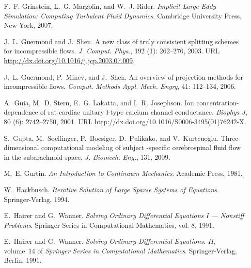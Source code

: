 \begin{thebibliography}{467}
F.~F. Grinstein, L.~G. Margolin, and W.~J. Rider.
\newblock \emph{Implicit Large Eddy Simulation: Computing Turbulent Fluid
  Dynamics}.
\newblock Cambridge University Press, New York, 2007.

J.~L. Guermond and J.~Shen.
\newblock A new class of truly consistent splitting schemes for incompressible
  flows.
\newblock \emph{J. Comput. Phys.}, 192 (1): 262--276, 2003.
\newblock URL \url{http://dx.doi.org/10.1016/j.jcp.2003.07.009}.

J.~L. Guermond, P.~Minev, and J.~Shen.
\newblock An overview of projection methods for incompressible flows.
\newblock \emph{Comput. Methods Appl. Mech. Engrg}, 41: 112--134,
  2006.

A.~Guia, M.~D. Stern, E.~G. Lakatta, and I.~R. Josephson.
\newblock Ion concentration-dependence of rat cardiac unitary l-type calcium
  channel conductance.
\newblock \emph{Biophys J}, 80 (6): 2742--2750, 2001.
\newblock URL \url{http://dx.doi.org/10.1016/S0006-3495(01)76242-X}.

S.~Gupta, M.~Soellinger, P.~Boesiger, D.~Pulikako, and V.~Kurtcuoglu.
\newblock Three-dimensional computational modeling of subject -specific
  cerebrospinal fluid flow in the subarachnoid space.
\newblock \emph{J. Biomech. Eng.}, 131, 2009.

M.~E. Gurtin.
\newblock \emph{An Introduction to Continuum Mechanics}.
\newblock Academic Press, 1981.

W.~Hackbusch.
\newblock \emph{Iterative Solution of Large Sparse Systems of Equations}.
\newblock Springer-Verlag, 1994.

E.~Hairer and G.~Wanner.
\newblock \emph{Solving Ordinary Differential Equations {I} --- Nonstiff
  Problems}.
\newblock Springer Series in Computational Mathematics, vol. 8,
  1991{}.

E.~Hairer and G.~Wanner.
\newblock \emph{Solving Ordinary Differential Equations. {II}}, volume~14 of
  \emph{Springer Series in Computational Mathematics}.
\newblock Springer-Verlag, Berlin, 1991{}.


\end{thebibliography}
